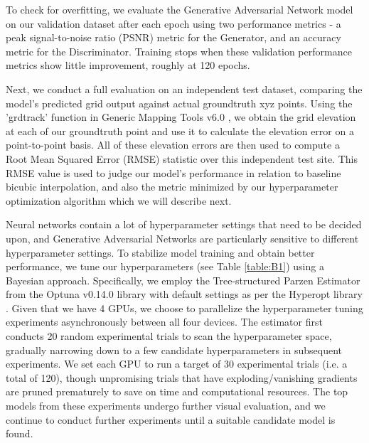\documentclass[tc, manuscript]{copernicus}
\begin{document}
To check for overfitting, we evaluate the Generative Adversarial Network model on our validation dataset after each epoch using two performance metrics - a peak signal-to-noise ratio (PSNR) metric for the Generator, and an accuracy metric for the Discriminator.
Training stops when these validation performance metrics show little improvement, roughly at 120 epochs.

Next, we conduct a full evaluation on an independent test dataset, comparing the model's predicted grid output against actual groundtruth xyz points.
Using the 'grdtrack' function in Generic Mapping Tools v6.0 \citep{WesselGenericMappingTools2019}, we obtain the grid elevation at each of our groundtruth point and use it to calculate the elevation error on a point-to-point basis.
All of these elevation errors are then used to compute a Root Mean Squared Error (RMSE) statistic over this independent test site.
This RMSE value is used to judge our model's performance in relation to baseline bicubic interpolation, and also the metric minimized by our hyperparameter optimization algorithm which we will describe next.

Neural networks contain a lot of hyperparameter settings that need to be decided upon, and Generative Adversarial Networks are particularly sensitive to different hyperparameter settings.
To stabilize model training and obtain better performance, we tune our hyperparameters (see Table \ref{table:B1}) using a Bayesian approach.
Specifically, we employ the Tree-structured Parzen Estimator \citep{BergstraAlgorithmsHyperparameterOptimization2011} from the Optuna v0.14.0 \citep{AkibaOptunaNextgenerationHyperparameter2019} library with default settings as per the Hyperopt library \citep{BergstraHyperoptPythonlibrary2015}.
Given that we have 4 GPUs, we choose to parallelize the hyperparameter tuning experiments asynchronously between all four devices.
The estimator first conducts 20 random experimental trials to scan the hyperparameter space, gradually narrowing down to a few candidate hyperparameters in subsequent experiments.
We set each GPU to run a target of 30 experimental trials (i.e. a total of 120), though unpromising trials that have exploding/vanishing gradients are pruned prematurely to save on time and computational resources.
The top models from these experiments undergo further visual evaluation, and we continue to conduct further experiments until a suitable candidate model is found.

\noappendix       %
\end{document}
